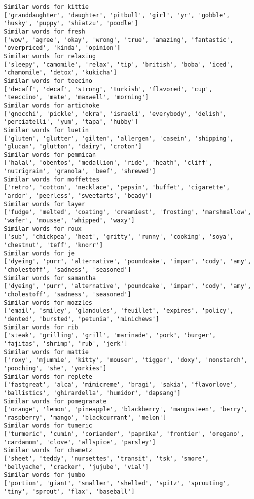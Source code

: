 \documentclass[11pt]{article}
\begin{document}
\begin{Verbatim}[commandchars=\\\{\}]
Similar words for kittie
['granddaughter', 'daughter', 'pitbull', 'girl', 'yr', 'gobble', 'husky', 'puppy', 'shiatzu', 'poodle']
Similar words for fresh
['wow', 'agree', 'okay', 'wrong', 'true', 'amazing', 'fantastic', 'overpriced', 'kinda', 'opinion']
Similar words for relaxing
['sleepy', 'camomile', 'relax', 'tip', 'british', 'boba', 'iced', 'chamomile', 'detox', 'kukicha']
Similar words for teecino
['decaff', 'decaf', 'strong', 'turkish', 'flavored', 'cup', 'teeccino', 'mate', 'maxwell', 'morning']
Similar words for artichoke
['gnocchi', 'pickle', 'okra', 'israeli', 'everybody', 'delish', 'perciatelli', 'yum', 'tapa', 'hubby']
Similar words for luetin
['gluten', 'glutter', 'gilten', 'allergen', 'casein', 'shipping', 'glucan', 'glutton', 'dairy', 'croton']
Similar words for pemmican
['halal', 'obentos', 'medallion', 'ride', 'heath', 'cliff', 'nutrigrain', 'granola', 'beef', 'shrewed']
Similar words for moffettes
['retro', 'cotton', 'necklace', 'pepsin', 'buffet', 'cigarette', 'ardor', 'peerless', 'sweetarts', 'beady']
Similar words for layer
['fudge', 'melted', 'coating', 'creamiest', 'frosting', 'marshmallow', 'wafer', 'mousse', 'whipped', 'waxy']
Similar words for roux
['sub', 'chickpea', 'heat', 'gritty', 'runny', 'cooking', 'soya', 'chestnut', 'teff', 'knorr']
Similar words for je
['dyeing', 'purr', 'alternative', 'poundcake', 'impar', 'cody', 'amy', 'cholestoff', 'sadness', 'seasoned']
Similar words for samantha
['dyeing', 'purr', 'alternative', 'poundcake', 'impar', 'cody', 'amy', 'cholestoff', 'sadness', 'seasoned']
Similar words for mozzles
['email', 'smiley', 'glandules', 'feuillet', 'expires', 'policy', 'dented', 'bursted', 'petunia', 'minichews']
Similar words for rib
['steak', 'grilling', 'grill', 'marinade', 'pork', 'burger', 'fajitas', 'shrimp', 'rub', 'jerk']
Similar words for mattie
['roxy', 'mjummie', 'kitty', 'mouser', 'tigger', 'doxy', 'nonstarch', 'pooching', 'she', 'yorkies']
Similar words for replete
['fastgreat', 'alca', 'mimicreme', 'bragi', 'sakia', 'flavorlove', 'ballistics', 'ghirardella', 'humidor', 'dapsang']
Similar words for pomegranate
['orange', 'lemon', 'pineapple', 'blackberry', 'mangosteen', 'berry', 'raspberry', 'mango', 'blackcurrant', 'melon']
Similar words for tumeric
['turmeric', 'cumin', 'coriander', 'paprika', 'frontier', 'oregano', 'cardamom', 'clove', 'allspice', 'parsley']
Similar words for chametz
['sheet', 'teddy', 'nursettes', 'transit', 'tsk', 'smore', 'bellyache', 'cracker', 'jujube', 'vial']
Similar words for jumbo
['portion', 'giant', 'smaller', 'shelled', 'spitz', 'sprouting', 'tiny', 'sprout', 'flax', 'baseball']

\end{Verbatim}
\end{document}
